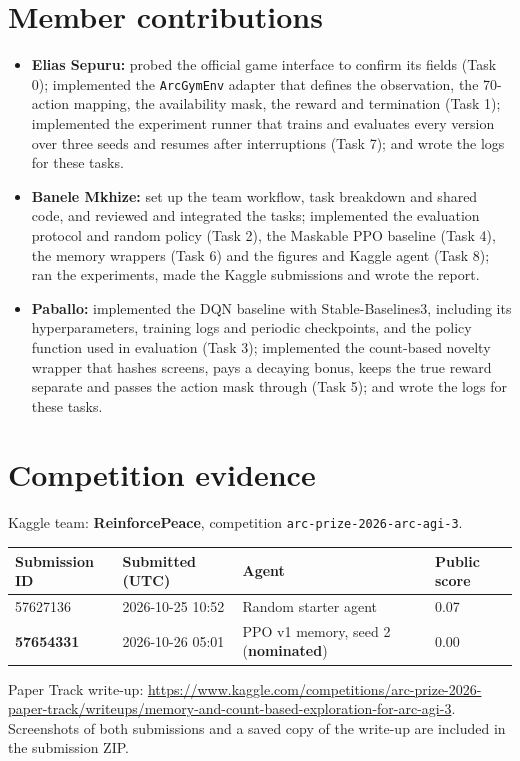 \documentclass[10pt]{article}
\begin{document}
\section{Member contributions}
\label{sec:supp-contributions}

\begin{itemize}
    \item \textbf{Elias Sepuru:} probed the official game interface to confirm its fields (Task 0); implemented the \texttt{ArcGymEnv} adapter that defines the observation, the 70-action mapping, the availability mask, the reward and termination (Task 1); implemented the experiment runner that trains and evaluates every version over three seeds and resumes after interruptions (Task 7); and wrote the logs for these tasks.
    \item \textbf{Banele Mkhize:} set up the team workflow, task breakdown and shared code, and reviewed and integrated the tasks; implemented the evaluation protocol and random policy (Task 2), the Maskable PPO baseline (Task 4), the memory wrappers (Task 6) and the figures and Kaggle agent (Task 8); ran the experiments, made the Kaggle submissions and wrote the report.
    \item \textbf{Paballo:} implemented the DQN baseline with Stable-Baselines3, including its hyperparameters, training logs and periodic checkpoints, and the policy function used in evaluation (Task 3); implemented the count-based novelty wrapper that hashes screens, pays a decaying bonus, keeps the true reward separate and passes the action mask through (Task 5); and wrote the logs for these tasks.
\end{itemize}

\section{Competition evidence}
\label{sec:supp-evidence}

Kaggle team: \textbf{ReinforcePeace}, competition \texttt{arc-prize-2026-arc-agi-3}.
\begin{center}
\small
\begin{tabular}{llll}
\toprule
\textbf{Submission ID} & \textbf{Submitted (UTC)} & \textbf{Agent} & \textbf{Public score} \\
\midrule
57627136 & 2026-10-25 10:52 & Random starter agent & 0.07 \\
\textbf{57654331} & 2026-10-26 05:01 & PPO v1 memory, seed 2 (\textbf{nominated}) & 0.00 \\
\bottomrule
\end{tabular}
\end{center}
Paper Track write-up: \url{https://www.kaggle.com/competitions/arc-prize-2026-paper-track/writeups/memory-and-count-based-exploration-for-arc-agi-3}. Screenshots of both submissions and a saved copy of the write-up are included in the submission ZIP.
\end{document}
